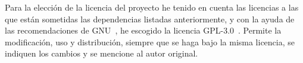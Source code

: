 Para la elección de la licencia del proyecto he tenido en cuenta las licencias a las que están sometidas las dependencias listadas anteriormente, y con la ayuda de las recomendaciones de GNU~\cite{wiki:gnu-choose}, he escogido la licencia GPL-3.0~\cite{wiki:gpl3}. Permite la modificación, uso y distribución, siempre que se haga bajo la misma licencia, se indiquen los cambios y se mencione al autor original.


